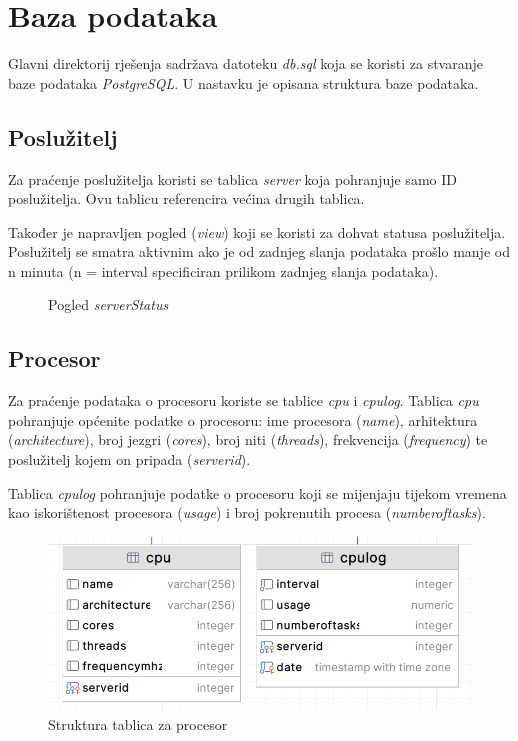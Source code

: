 \documentclass[zavrsnirad]{fer}
\begin{document}
\section{Baza podataka}
Glavni direktorij rješenja sadržava datoteku \textit{db.sql} koja se koristi za stvaranje baze podataka \textit{PostgreSQL}. U nastavku je opisana struktura baze podataka.

\subsection{Poslužitelj}
Za praćenje poslužitelja koristi se tablica \textit{server} koja pohranjuje samo ID poslužitelja. Ovu tablicu referencira većina drugih tablica.

Također je napravljen pogled (\textit{view}) koji se koristi za dohvat statusa poslužitelja. Poslužitelj se smatra aktivnim ako je od zadnjeg slanja podataka prošlo manje od n minuta (n = interval specificiran prilikom zadnjeg slanja podataka).

\begin{figure}[htb]
	\centering
	
	\caption{Pogled \textit{serverStatus}}
\end{figure}
\FloatBarrier

\subsection{Procesor}
Za praćenje podataka o procesoru koriste se tablice \textit{cpu} i \textit{cpulog}. Tablica \textit{cpu} pohranjuje općenite podatke o procesoru: ime procesora (\textit{name}), arhitektura (\textit{architecture}), broj jezgri (\textit{cores}), broj niti (\textit{threads}), frekvencija (\textit{frequency}) te poslužitelj kojem on pripada (\textit{serverid}).

Tablica \textit{cpulog} pohranjuje podatke o procesoru koji se mijenjaju tijekom vremena kao iskorištenost procesora (\textit{usage}) i broj pokrenutih procesa (\textit{numberoftasks}).

\begin{figure}[htb!]
	\centering
	\includegraphics[width=0.65\linewidth]{images/db_cpu.png} 
	\caption{Struktura tablica za procesor}
\end{figure}
\FloatBarrier
\end{document}
